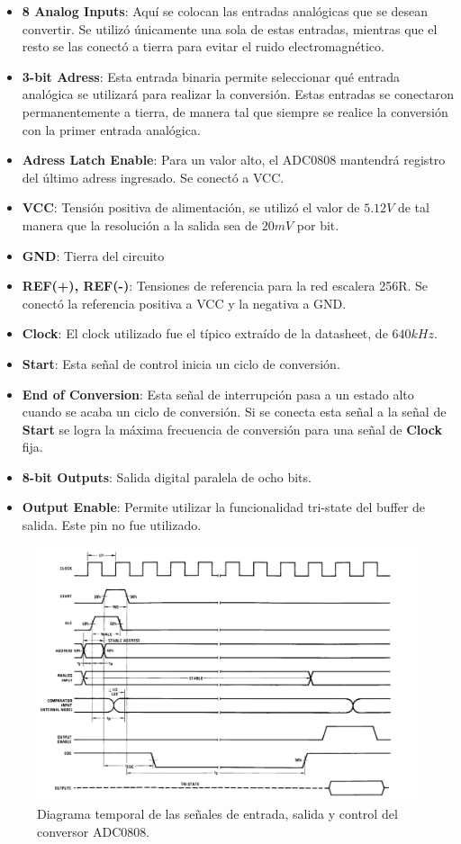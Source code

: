 \begin{itemize}
\item \textbf{8 Analog Inputs}: Aquí se colocan las entradas analógicas que se desean convertir. Se utilizó únicamente una sola de estas entradas, mientras que el resto se las conectó a tierra para evitar el ruido electromagnético.
\item \textbf{3-bit Adress}: Esta entrada binaria permite seleccionar qué entrada analógica se utilizará para realizar la conversión. Estas entradas se conectaron permanentemente a tierra, de manera tal que siempre se realice la conversión con la primer entrada analógica.
\item \textbf{Adress Latch Enable}: Para un valor alto, el ADC0808 mantendrá registro del último adress ingresado. Se conectó a VCC.
\item \textbf{VCC}: Tensión positiva de alimentación, se utilizó el valor de $5.12V$ de tal manera que la resolución a la salida sea de $20mV$ por bit.
\item \textbf{GND}: Tierra del circuito
\item \textbf{REF(+), REF(-)}: Tensiones de referencia para la red escalera 256R. Se conectó la referencia positiva a VCC y la negativa a GND.
\item \textbf{Clock}: El clock utilizado fue el típico extraído de la datasheet, de $640kHz$.
\item \textbf{Start}: Esta señal de control inicia un ciclo de conversión.
\item \textbf{End of Conversion}: Esta señal de interrupción pasa a un estado alto cuando se acaba un ciclo de conversión. Si se conecta esta señal a la señal de \textbf{Start} se logra la máxima frecuencia de conversión para una señal de \textbf{Clock} fija.
\item \textbf{8-bit Outputs}: Salida digital paralela de ocho bits.
\item \textbf{Output Enable}: Permite utilizar la funcionalidad tri-state del buffer de salida. Este pin no fue utilizado.
\end{itemize}

\begin{figure}[H]
\centering
\includegraphics[width=0.9\linewidth]{ImagenesEjercicio1/ADC_TIMING.png}
\caption{Diagrama temporal de las señales de entrada, salida y control del conversor ADC0808.}
\label{ADC_TIMING}
\end{figure}

